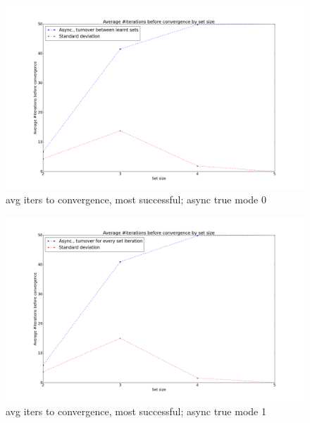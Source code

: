 \begin{figure}[h!]
    \centering
    \includegraphics[width=13cm]{fig/avg_convergence_iterations_async_true_mode_0.png}
    \caption{avg iters to convergence, most successful; async true mode 0}
    \label{fig:avg_convergence_iterations_async_true_mode_0}
\end{figure}

\begin{figure}[h!]
    \centering
    \includegraphics[width=13cm]{fig/avg_convergence_iterations_async_true_mode_1.png}
    \caption{avg iters to convergence, most successful; async true mode 1}
    \label{fig:avg_convergence_iterations_async_true_mode_1}
\end{figure}

